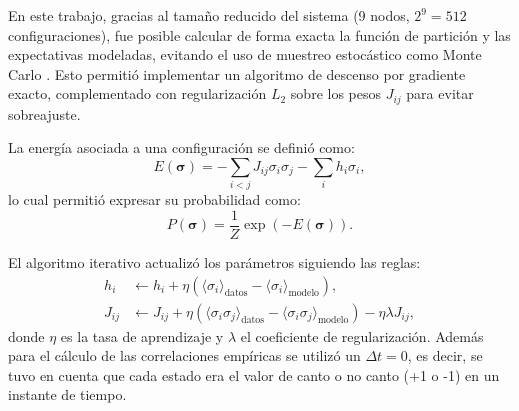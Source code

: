 En este trabajo, gracias al tamaño reducido del sistema (9 
nodos, \(2^9 = 512\) configuraciones), fue posible calcular de 
forma exacta la función de partición y las expectativas 
modeladas, evitando el uso de muestreo estocástico como Monte 
Carlo \cite{pena2001deduccion}. Esto permitió implementar un algoritmo de descenso por 
gradiente exacto, complementado con regularización \(L_2\) sobre 
los pesos \( J_{ij} \) para evitar sobreajuste.

La energía asociada a una configuración se definió como:
\[
E(\boldsymbol{\sigma}) = -\sum_{i<j} J_{ij} \sigma_i \sigma_j - \sum_i h_i \sigma_i,
\]
lo cual permitió expresar su probabilidad como:
\[
P(\boldsymbol{\sigma}) = \frac{1}{Z} \exp\left(-E(\boldsymbol{\sigma})\right).
\]

El algoritmo iterativo actualizó los parámetros siguiendo las 
reglas:
\begin{align}
    h_i &\leftarrow h_i + \eta \left( \langle \sigma_i \rangle_{\text{datos}} - \langle \sigma_i \rangle_{\text{modelo}} \right), \\
    J_{ij} &\leftarrow J_{ij} + \eta \left( \langle \sigma_i \sigma_j \rangle_{\text{datos}} - \langle \sigma_i \sigma_j \rangle_{\text{modelo}} \right) - \eta \lambda J_{ij},
\end{align}
donde \( \eta \) es la tasa de aprendizaje y \( \lambda \) el 
coeficiente de regularización. Además para el cálculo de las correlaciones
empíricas se utilizó un \(\Delta t = 0\), es decir, se tuvo en cuenta que cada
estado era el valor de canto o no canto (+1 o -1) en un instante de tiempo.

